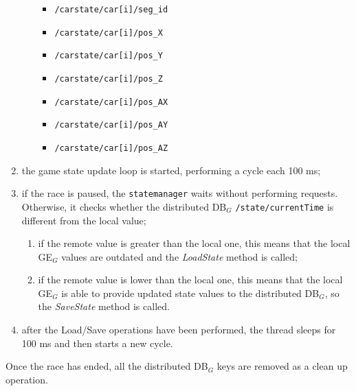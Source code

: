 \begin{enumerate}
\begin{enumerate}
\begin{itemize}
			\item \texttt{/carstate/car[i]/seg\_id}
			\item \texttt{/carstate/car[i]/pos\_X}
			\item \texttt{/carstate/car[i]/pos\_Y}
			\item \texttt{/carstate/car[i]/pos\_Z}
			\item \texttt{/carstate/car[i]/pos\_AX}
			\item \texttt{/carstate/car[i]/pos\_AY}
			\item \texttt{/carstate/car[i]/pos\_AZ}
		\end{itemize}
	\end{enumerate}
	\item the game state update loop is started, performing a cycle each 100 ms;
	\item if the race is paused, the \texttt{statemanager} waits without performing requests. Otherwise, it checks whether the distributed DB$_G$ \texttt{/state/currentTime} is different from the local value;
	\begin{enumerate}
		\item if the remote value is greater than the local one, this means that the local GE$_G$ values are outdated and the \textit{LoadState} method is called;
		\item if the remote value is lower than the local one, this means that the local GE$_G$ is able to provide updated state values to the distributed DB$_G$, so the \textit{SaveState} method is called.
	\end{enumerate}
	\item after the Load/Save operations have been performed, the thread sleeps for 100 ms and then starts a new cycle.
\end{enumerate}
Once the race has ended, all the distributed DB$_G$ keys are removed as a clean up operation.

